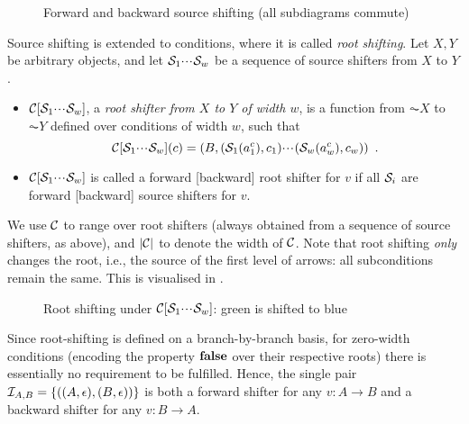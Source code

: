 \begin{figure}
\centering

\caption{Forward and backward source shifting (all subdiagrams commute)}
\end{figure}

Source shifting is extended to conditions, where it is called \emph{root shifting}. Let $X,Y$ be arbitrary objects, and let $\mathcal{S}_1{\cdotp\mkern-2mu\cdotp\mkern-2mu\cdotp\mkern1mu} \mathcal{S}_w$ be a sequence of source shifters from $X$ to $Y$.
%
\begin{itemize}
\item $\mathcal{C}[\mathcal{S}_1{\cdotp\mkern-2mu\cdotp\mkern-2mu\cdotp\mkern1mu} \mathcal{S}_w]$, a \emph{root shifter from $X$ to $Y$ of width $w$}, is a function from $\AC X$ to $\AC Y$ defined over conditions of width $w$, such that 
\[ \mathcal{C}[\mathcal{S}_1{\cdotp\mkern-2mu\cdotp\mkern-2mu\cdotp\mkern1mu} \mathcal{S}_w](c) = (B,(\mathcal{S}_1(a^c_1),c_1){\cdotp\mkern-2mu\cdotp\mkern-2mu\cdotp\mkern1mu} (\mathcal{S}_w(a^c_w),c_w)) \enspace.
\]
\item $\mathcal{C}[\mathcal{S}_1{\cdotp\mkern-2mu\cdotp\mkern-2mu\cdotp\mkern1mu} \mathcal{S}_w]$ is called a forward [backward] root shifter for $v$ if all $\mathcal{S}_i$ are forward [backward] source shifters for $v$.
\end{itemize}
%
We use $\mathcal{C}$ to range over root shifters (always obtained from a sequence of source shifters, as above), and $|\mathcal{C}|$ to denote the width of $\mathcal{C}$. Note that root shifting \emph{only} changes the root, i.e., the source of the first level of arrows: all subconditions remain the same. This is visualised in .
%
\begin{figure}
\centering

\caption{Root shifting under $\mathcal{C}[\mathcal{S}_1{\cdotp\mkern-2mu\cdotp\mkern-2mu\cdotp\mkern1mu} \mathcal{S}_w]$: green is shifted to blue}
\end{figure}

Since root-shifting is defined on a branch-by-branch basis, for zero-width conditions (encoding the property $\textbf{false}$ over their respective roots) there is essentially no requirement to be fulfilled. Hence, the single pair $\mathcal{I}_{A,B}=\{{((A,\epsilon),(B,\epsilon))}\}$ is both a forward shifter for any $v:A\to B$ and a backward shifter for any $v:B\to A$.

